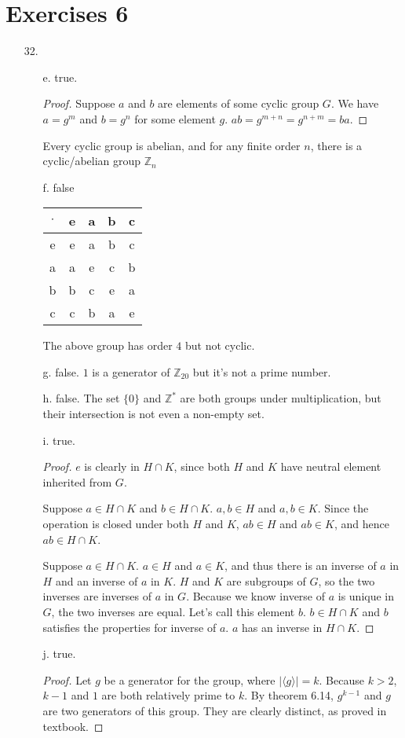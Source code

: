 \documentclass{article}
\begin{document}
\section*{Exercises 6}
\begin{itemize}
\item [32.]
  \begin{itemize}
  \item [e.] true.
    \begin{proof}
      Suppose $a$ and $b$ are elements of some cyclic group $G$. We have $a=g^m$ and $b=g^n$ for some element $g$. $ab = g^{m+n} = g^{n+m}=ba$.
    \end{proof}
    Every cyclic group is abelian, and for any finite order $n$, there
    is a cyclic/abelian group $\mathbb{Z}_n$
  \item [f.] false\\
    \begin{tabular}{c | c c c c }
      $\cdot$&e&a&b&c\\
      \hline
      e&e&a&b&c\\
      a&a&e&c&b\\
      b&b&c&e&a\\
      c&c&b&a&e
    \end{tabular}
    The above group has order $4$ but not cyclic. 
  \item [g.] false.
    $1$ is a generator of $\mathbb{Z}_{20}$ but it's not a prime number.
  \item [h.] false. The set $\{0\}$ and $\mathbb{Z}^*$ are both groups under multiplication, but their intersection is not even a non-empty set.
  \item [i.] true.
    \begin{proof}
      $e$ is clearly in $H \cap K$, since both $H$ and $K$ have neutral element inherited from $G$.

      Suppose $a \in H \cap K$ and $b \in H \cap K$. $a,b\in H$ and $a,b \in K$. Since the operation is closed under both $H$ and $K$, $ab \in H$ and $ab \in K$, and hence $ab \in H \cap K$.

      Suppose $a \in H \cap K$. $a \in H$ and $a \in K$, and thus
      there is an inverse of $a$ in $H$ and an inverse of $a$ in $K$. $H$ and $K$ are subgroups of $G$, so the two inverses are inverses of $a$ in $G$. Because we know inverse of $a$ is unique in $G$, the two inverses are equal. Let's call this element $b$. $b \in H \cap K$ and $b$ satisfies the properties for inverse of $a$. $a$ has an inverse in $H \cap K$.
    \end{proof}
  \item [j.] true.
    \begin{proof}
      Let $g$ be a generator for the group, where $|\langle g \rangle|=k$. Because $k>2$, $k-1$ and $1$ are both relatively prime to $k$. By theorem 6.14, $g^{k-1}$ and $g$ are two generators of this group. They are clearly distinct, as proved in textbook.
    \end{proof}
  \end{itemize}
\end{itemize}
\end{document}
